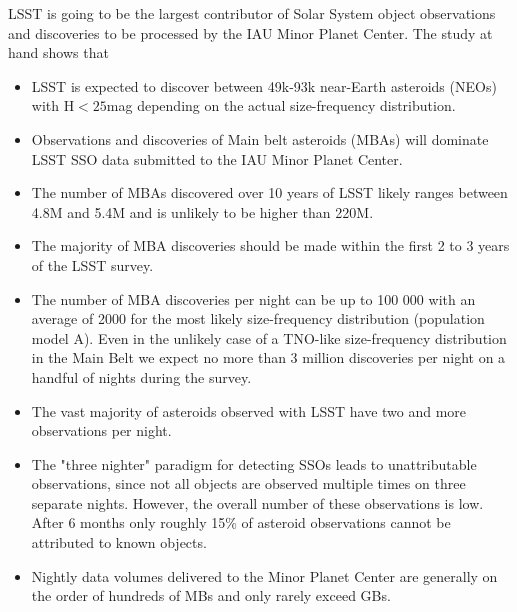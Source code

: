 LSST is going to be the largest contributor of Solar System object observations and discoveries to be processed by the \gls{IAU} Minor Planet \gls{Center}.
The study at hand shows that
\begin{itemize}
\item \gls{LSST} is expected to discover between 49k-93k near-Earth asteroids (NEOs)  with H$<25$mag depending on the actual size-frequency distribution.
\item Observations and discoveries of Main belt asteroids (MBAs) will dominate \gls{LSST} \gls{SSO} data submitted to the \gls{IAU} Minor Planet \gls{Center}.
\item The number of MBAs discovered over 10 years of \gls{LSST} likely ranges between 4.8M and 5.4M and is unlikely to be higher than 220M.
\item The majority of \gls{MBA} discoveries should be made within the first 2 to 3 years of the \gls{LSST} survey.
\item The number of \gls{MBA} discoveries per night can be up to 100 000 with an average of 2000 for the most likely size-frequency distribution (population model A). Even in the unlikely case of a \gls{TNO}-like size-frequency distribution in the Main Belt we expect no more than 3 million discoveries per night on a handful of nights during the survey.
\item The vast majority of asteroids observed with \gls{LSST} have two and more observations per night.
\item The "three nighter" paradigm for detecting SSOs leads to unattributable observations, since not all objects are observed multiple times on three separate nights. However, the overall number of these observations is low. After 6 months only roughly 15\% of asteroid observations cannot be attributed to known objects.
\item Nightly data volumes delivered to the Minor Planet \gls{Center} are generally on the order of hundreds of MBs and only rarely exceed \gls{GB}s.
\end{itemize}
